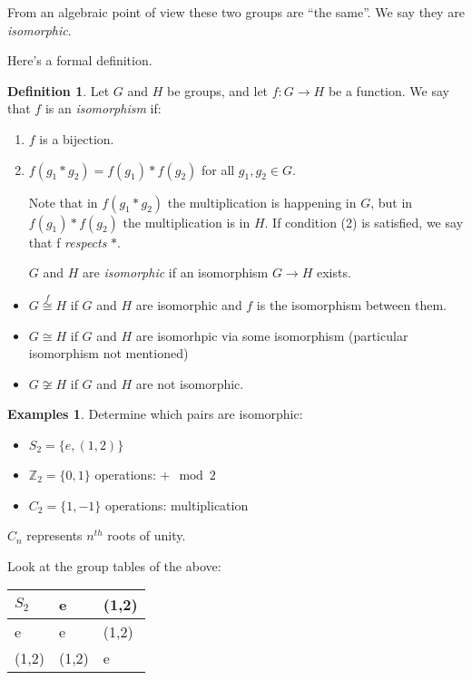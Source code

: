 \documentclass{article}
\theoremstyle{definition}
\newtheorem{definition}{Definition}
\newtheorem*{exmps}{Examples}
\newcommand{\ism}{\cong}
\begin{document}
From an algebraic point of view these two groups are ``the same''. We say they are \textit{isomorphic}.

Here's a formal definition.\\


\begin{definition}
Let $G$ and $H$ be groups, and let $f : G \rightarrow H$ be a function. We say that $f$ is an \emph{isomorphism} if:
\begin{enumerate}
\item $f$ is a bijection.
\item $f(g_1 * g_2)=f(g_1) * f(g_2) $ for all $g_1, g_2 \in G$.

Note that in $f(g_1 * g_2)$ the multiplication is happening in $G$, but in $f(g_1) * f(g_2)$ the multiplication is in $H$. If condition (2) is satisfied, we say that f \emph{respects} $*$.

$G$ and $H$ are \emph{isomorphic} if an isomorphism $G \rightarrow H$ exists.
\end{enumerate}
\end{definition}

\begin{itemize}
  \item 
    $G \overset{f}{\ism} H$ if $G$ and $H$ are isomorphic and $f$ is the isomorphism between them.
  \item
$G \ism H$ if $G$ and $H$ are isomorhpic via some isomorphism (particular isomorphism not mentioned)
  \item 
$G \not\ism H$ if $G$ and $H$ are not isomorphic.\\
\end{itemize}
\begin{exmps}
Determine which pairs are isomorphic:

\begin{itemize}
  \item $S_2=\{e, (1, 2)\}$
  \item $\mathbb{Z}_2=\{0,1\}$ operations: $+\mod 2$
  \item $C_2=\{1,-1\}$ operations: multiplication
\end{itemize}
$C_n$ represents $n^{th}$ roots of unity.
  
\end{exmps}

Look at the group tables of the above:

\begin{table}[h]
  \centering
\label{my-label}
\begin{tabular}{l|ll}
$S_2$  & e     & (1,2) \\
\hline
e     & e     & (1,2) \\
(1,2) & (1,2) & e    
\end{tabular}
\end{table}
\end{document}
